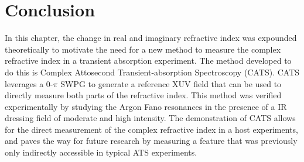 \section{Conclusion}
\label{sec:CATS_conclusion}
In this chapter, the change in real and imaginary refractive index was expounded theoretically to motivate the need for a new method to measure the complex refractive index in a transient absorption experiment.  The method developed to do this is Complex Attosecond Transient-absorption Spectroscopy (CATS).  CATS leverages a 0-$\pi$ SWPG to generate a reference XUV field that can be used to directly measure both parts of the refractive index.  This method was verified experimentally by studying the Argon Fano resonances in the presence of a IR dressing field of moderate and high intensity.  The demonstration of CATS allows for the direct measurement of the complex refractive index in a host experiments, and paves the way for future research by measuring a feature that was previously only indirectly accessible in typical ATS experiments. 


